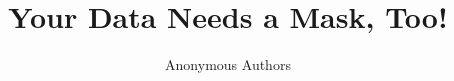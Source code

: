 \documentclass[letterpaper,twocolumn,10pt]{article}
\newcommand{\name}{Phantom\xspace}
\begin{document}

\date{}

\title{\Large \bf Your Data Needs a Mask, Too!}


\author{
{\rm Anonymous Authors}\\
} %

\maketitle










\printbibliography

\end{document}
